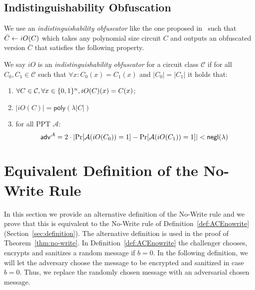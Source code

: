 \documentclass{llncs}
\begin{document}
\subsection{Indistinguishability Obfuscation}
\newcommand{\Obf}{iO}
\newcommand{\Circs}{\mathcal{C}}
\newcommand{\obf}[1]{\bar{#1}}
\newcommand{\poly}{\mathsf{poly}}
\newcommand{\Adv}{\mathcal{A}}


We use an \emph{indistinguishability obfuscator} like the one proposed in~\cite{DBLP:conf/focs/GargGH0SW13} such that $\obf{C}\from \Obf(C)$ which takes any polynomial size circuit $C$ and outputs an obfuscated version $\obf{C}$ that satisfies the following property.
\begin{defi} \label{def:io} We say $\Obf$ is an \emph{indistinguishability obfuscator} for a circuit class $\Circs$ if for all $C_0,C_1\in\Circs$ such that $\forall x:C_0(x)=C_1(x)$ and $|C_0|=|C_1|$ it holds that:
\begin{enumerate}
\item $\forall C\in \Circs, \forall x\in\zon,  \Obf(C)(x)=C(x)$;
\item $|\Obf(C)|=\poly(\lambda|C|)$  
\item  for all PPT $\Adv$:
$$
\adv{\Adv} = 2\cdot \left | \Pr[\Adv(\Obf(C_0)) = 1]-\Pr[\Adv(\Obf(C_1)) = 1]\right| < \negl(\lambda)
$$
\end{enumerate}
\end{defi}








\section{Equivalent Definition of the No-Write Rule}
In this section we provide an alternative definition of the No-Write rule and we prove that this is equivalent to the No-Write rule of Definition~\ref{def:ACEnowrite} (Section~\ref{sec:definition}). The alternative definition is used in the proof of Theorem~\ref{thm:no-write}.
In Definition~\ref{def:ACEnowrite} the challenger chooses, encrypts and sanitizes a random message if $b=0$. In the following definition, we will let the adversary choose the message to be encrypted and sanitized in case $b=0$. Thus, we replace the randomly chosen message with an adversarial chosen message.
\end{document}
